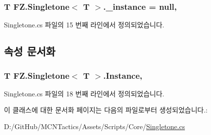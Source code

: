\subsubsection[{\texorpdfstring{\+\_\+instance}{_instance}}]{\setlength{\rightskip}{0pt plus 5cm}T {\bf F\+Z.\+Singletone}$<$ T $>$.\+\_\+instance = null\hspace{0.3cm}{\ttfamily [static]}, {\ttfamily [protected]}}\hypertarget{class_f_z_1_1_singletone_a1da3d44c1904d88e6fc0252c9333c221}{}\label{class_f_z_1_1_singletone_a1da3d44c1904d88e6fc0252c9333c221}


Singletone.\+cs 파일의 15 번째 라인에서 정의되었습니다.



\subsection{속성 문서화}
\subsubsection[{\texorpdfstring{Instance}{Instance}}]{\setlength{\rightskip}{0pt plus 5cm}T {\bf F\+Z.\+Singletone}$<$ T $>$.Instance\hspace{0.3cm}{\ttfamily [static]}, {\ttfamily [get]}}\hypertarget{class_f_z_1_1_singletone_a8e7ba3cf5cff48b1101428beefcd76b4}{}\label{class_f_z_1_1_singletone_a8e7ba3cf5cff48b1101428beefcd76b4}


Singletone.\+cs 파일의 18 번째 라인에서 정의되었습니다.



이 클래스에 대한 문서화 페이지는 다음의 파일로부터 생성되었습니다.\+:\begin{DoxyCompactItemize}
\item 
D\+:/\+Git\+Hub/\+M\+C\+N\+Tactics/\+Assets/\+Scripts/\+Core/\hyperlink{_singletone_8cs}{Singletone.\+cs}\end{DoxyCompactItemize}
